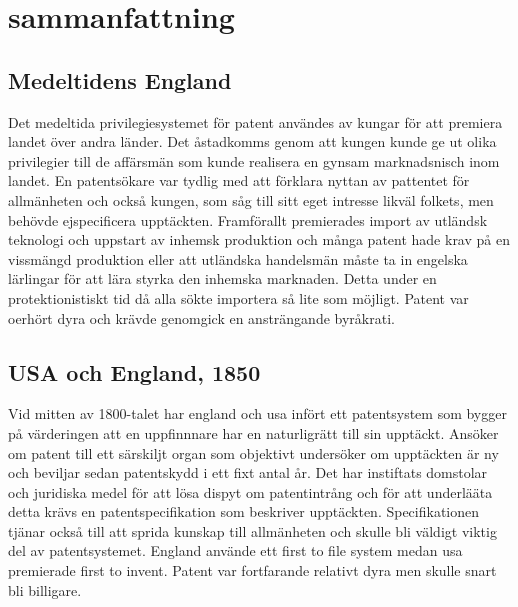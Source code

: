 \section{sammanfattning}
\label{sec:samm}


\subsection{Medeltidens England}

Det medeltida privilegiesystemet för patent användes av kungar för att premiera landet över andra länder. Det åstadkomms genom att kungen kunde ge ut olika privilegier till de affärsmän som kunde realisera en gynsam marknadsnisch inom landet. En patentsökare var tydlig med att förklara nyttan av pattentet för allmänheten och också kungen, som såg till sitt eget intresse likväl folkets, men behövde ejspecificera upptäckten. Framförallt premierades import av utländsk teknologi och uppstart av inhemsk produktion och många patent hade krav på en vissmängd produktion eller att utländska handelsmän måste ta in engelska lärlingar för att lära styrka den inhemska marknaden. Detta under en protektionistiskt tid då alla sökte importera så lite som möjligt. Patent var oerhört dyra och krävde genomgick en ansträngande byråkrati.

\subsection{USA och England, 1850}

Vid mitten av 1800-talet har england och usa infört ett patentsystem som bygger på värderingen att en uppfinnnare har en naturligrätt till sin upptäckt. Ansöker om patent till ett särskiljt organ som objektivt undersöker om upptäckten är ny och beviljar sedan patentskydd i ett fixt antal år. Det har instiftats domstolar och juridiska medel för att lösa dispyt om patentintrång och för att underlääta detta krävs en patentspecifikation som beskriver upptäckten. Specifikationen tjänar också till att sprida kunskap till allmänheten och skulle bli väldigt viktig del av patentsystemet. England använde ett first to file system medan usa premierade first to invent. Patent var fortfarande relativt dyra men skulle snart bli billigare.

